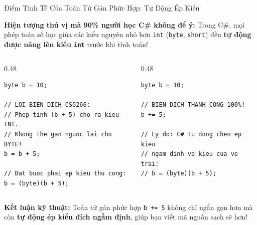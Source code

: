 \documentclass[aspectratio=169, 10pt]{beamer}
\begin{document}
\begin{frame}[fragile]{Điểm Tinh Tế Của Toán Tử Gán Phức Hợp: Tự Động Ép Kiểu}
  \begin{alertblock}{\textbf{Hiện tượng thú vị mà 90\% người học C\# không để ý:}}
    Trong C\#, mọi phép toán số học giữa các kiểu nguyên nhỏ hơn \texttt{int} (\texttt{byte}, \texttt{short}) đều \textbf{tự động được nâng lên kiểu \texttt{int}} trước khi tính toán!
  \end{alertblock}

  \begin{columns}[T]
    \begin{column}{0.48\textwidth}
      \begin{tcolorbox}[colback=AlertRed!10,colframe=AlertRed,title=\textbf{Cách viết thông thường (Bị lỗi!)} ,fonttitle=\small\bfseries]
\begin{lstlisting}[numbers=none]
byte b = 10;

// LOI BIEN DICH CS0266:
// Phep tinh (b + 5) cho ra kieu INT.
// Khong the gan nguoc lai cho BYTE!
b = b + 5; 

// Bat buoc phai ep kieu thu cong:
b = (byte)(b + 5);
\end{lstlisting}
      \end{tcolorbox}
    \end{column}

    \begin{column}{0.48\textwidth}
      \begin{tcolorbox}[colback=UniGreen!10,colframe=UniGreen,title=\textbf{Dùng toán tử gán phức hợp (Hợp lệ 100\%!)},fonttitle=\small\bfseries]
\begin{lstlisting}[numbers=none]
byte b = 10;

// BIEN DICH THANH CONG 100%!
b += 5; 

// Ly do: C# tu dong chen ep kieu 
// ngam dinh ve kieu cua ve trai:
// b = (byte)(b + 5);
\end{lstlisting}
      \end{tcolorbox}
    \end{column}
  \end{columns}

  \begin{exampleblock}{\textbf{Kết luận kỹ thuật:}}
    Toán tử gán phức hợp \texttt{b += 5} không chỉ ngắn gọn hơn mà còn \textbf{tự động ép kiểu đích ngầm định}, giúp bạn viết mã nguồn sạch sẽ hơn!
  \end{exampleblock}
\end{frame}
\end{document}
